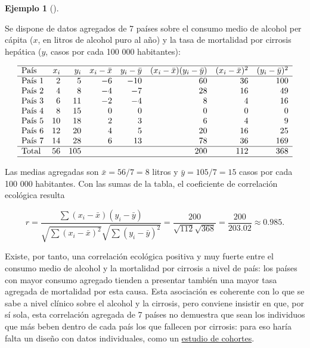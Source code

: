 \documentclass[
  spanish,
  a4paper,
]{scrreport}
\theoremstyle{definition}
\newtheorem{example}{Ejemplo}[chapter]
\theoremstyle{definition}
\theoremstyle{remark}
\begin{document}
\begin{example}[]\protect\hypertarget{exm-ecologicos-correlacion-alcohol-cirrosis}{}\label{exm-ecologicos-correlacion-alcohol-cirrosis}

Se dispone de datos agregados de 7 países sobre el consumo medio de
alcohol per cápita (\(x\), en litros de alcohol puro al año) y la tasa
de mortalidad por cirrosis hepática (\(y\), casos por cada 100 000
habitantes):

\[
\begin{array}{lrrrrrrr}
\hline
\mbox{País} & x_i & y_i & x_i-\bar x & y_i-\bar y & (x_i-\bar x)(y_i-\bar y) & (x_i-\bar x)^2 & (y_i-\bar y)^2\\
\hline
\mbox{País 1} & 2 & 5 & -6 & -10 & 60 & 36 & 100\\
\mbox{País 2} & 4 & 8 & -4 & -7 & 28 & 16 & 49\\
\mbox{País 3} & 6 & 11 & -2 & -4 & 8 & 4 & 16\\
\mbox{País 4} & 8 & 15 & 0 & 0 & 0 & 0 & 0\\
\mbox{País 5} & 10 & 18 & 2 & 3 & 6 & 4 & 9\\
\mbox{País 6} & 12 & 20 & 4 & 5 & 20 & 16 & 25\\
\mbox{País 7} & 14 & 28 & 6 & 13 & 78 & 36 & 169\\
\hline
\mbox{Total} & 56 & 105 & & & 200 & 112 & 368\\
\hline
\end{array}
\]

Las medias agregadas son \(\bar x = 56/7 = 8\) litros y
\(\bar y = 105/7 = 15\) casos por cada 100 000 habitantes. Con las sumas
de la tabla, el coeficiente de correlación ecológica resulta

\[r = \frac{\sum (x_i-\bar x)(y_i-\bar y)}{\sqrt{\sum (x_i-\bar x)^2}\sqrt{\sum (y_i-\bar y)^2}} = \frac{200}{\sqrt{112}\sqrt{368}} = \frac{200}{203.02} \approx 0.985.\]

Existe, por tanto, una correlación ecológica positiva y muy fuerte entre
el consumo medio de alcohol y la mortalidad por cirrosis a nivel de
país: los países con mayor consumo agregado tienden a presentar también
una mayor tasa agregada de mortalidad por esta causa. Esta asociación es
coherente con lo que se sabe a nivel clínico sobre el alcohol y la
cirrosis, pero conviene insistir en que, por sí sola, esta correlación
agregada de 7 países no demuestra que sean los individuos que más beben
dentro de cada país los que fallecen por cirrosis: para eso haría falta
un diseño con datos individuales, como un
\hyperref[estudios-de-cohortes]{estudio de cohortes}.

\end{example}
\end{document}
